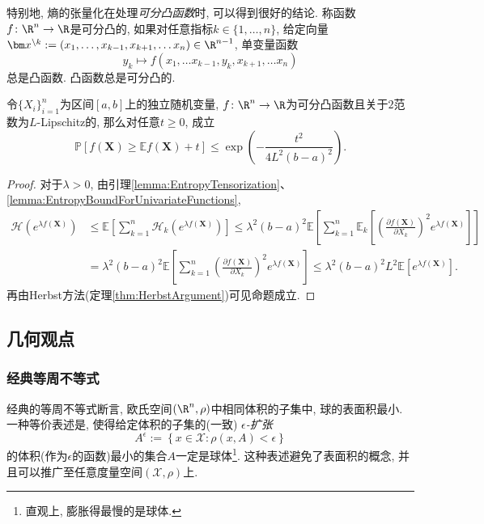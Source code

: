 特别地, 熵的张量化在处理\emph{可分凸函数}时, 可以得到很好的结论. 
称函数$f \colon \R^n \to \R$是可分凸的, 如果对任意指标$k \in \{1, \dots, n\}$, 给定向量$\bm x^{\backslash k} := (x_1, \dots, x_{k-1}, x_{k+1}, \dots x_n) \in \R^{n-1}$, 单变量函数
\begin{equation*}
	y_k \mapsto f(x_1, \dots x_{k-1}, y_k, x_{k+1}, \dots x_n)
\end{equation*}
总是凸函数. 
凸函数总是可分凸的. 

\begin{proposition}
	令$\{X_i\}_{i=1}^n$为区间$[a, b]$上的独立随机变量, $f \colon \R^n \to \R$为可分凸函数且关于$2$范数为$L$-Lipschitz的, 那么对任意$t \geq 0$, 成立
	\begin{equation*}
		\mathbb{P}[f(\bm X) \geq \mathbb{E}f(\bm X) + t] 
		\leq \exp \left( - \frac{t^2}{4L^2 (b-a)^2} \right). 
	\end{equation*}	
\end{proposition}
\begin{proof}
	对于$\lambda > 0$, 由引理\ref{lemma:EntropyTensorization}、 \ref{lemma:EntropyBoundForUnivariateFunctions}, 
	\begin{align*}
		\mathcal{H}(e^{\lambda f(\bm X)})
		&\leq \mathbb{E}\left[ \sum_{k=1}^n \mathcal{H}_k (e^{\lambda f(\bm X)}) \right]
		\leq \lambda^2 (b-a)^2  \mathbb{E}\left[ \sum_{k=1}^n \mathbb{E}_k\left[ \left(\frac{\partial f(\bm X)}{\partial X_k} \right)^2 e^{\lambda f(\bm X)}\right] \right] \\
		&= \lambda^2 (b-a)^2  \mathbb{E}\left[ \sum_{k=1}^n \left(\frac{\partial f(\bm X)}{\partial X_k} \right)^2 e^{\lambda f(\bm X)}\right]
		\leq \lambda^2 (b-a)^2 L^2 \mathbb{E}[e^{\lambda f(\bm X)}]. 
	\end{align*}
	再由Herbst方法(定理\ref{thm:HerbstArgument})可见命题成立. 
\end{proof}



\subsection{几何观点}

\subsubsection{经典等周不等式}

经典的等周不等式断言, 欧氏空间$(\R^n, \rho)$中相同体积的子集中, 球的表面积最小. 
一种等价表述是, 使得给定体积的子集的(一致) \emph{$\epsilon$-扩张}
\begin{equation*}
	A^{\epsilon} := \left\{ x \in \mathcal{X} \colon \rho(x, A) < \epsilon \right\}
\end{equation*}
的体积(作为$\epsilon$的函数)最小的集合$A$一定是球体\footnote{直观上, 膨胀得最慢的是球体.}.  
这种表述避免了表面积的概念, 并且可以推广至任意度量空间$(\mathcal{X}, \rho)$上. 

